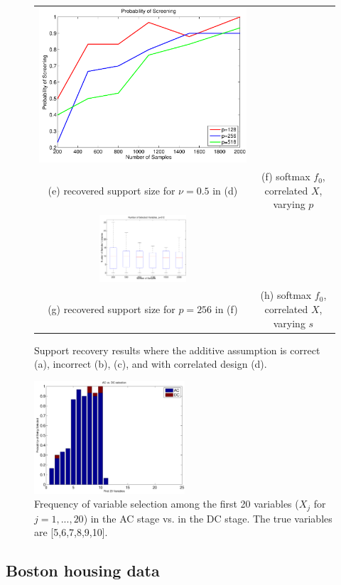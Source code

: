 \begin{figure}[!t]
\begin{center}
\begin{tabular}{cc}
\includegraphics[width=.42\textwidth]{figs/CurveS}\\
(e) recovered support size for $\nu=0.5$ in (d) & (f) softmax $f_0$, correlated $X$, varying $p$ \\
\includegraphics[width=0.42\textwidth]{figs/S_support_box} & \\
(g) recovered support size for $p=256$ in (f) & (h) softmax $f_0$, correlated $X$, varying $s$ 
\end{tabular}
\end{center}
\caption{Support recovery results where the additive assumption is
  correct (a), incorrect (b), (c), and with correlated design (d).}\label{Support}
\vskip10pt
\end{figure}

\begin{figure}
\includegraphics[width=0.5\textwidth]{figs/ACvDC}
\caption{Frequency of variable selection among the first 20 variables ($X_j$ for $j=1,...,20$) in the AC stage vs. in the DC stage. The true variables are [5,6,7,8,9,10].}
\label{fig:ac_v_dc}
\end{figure}


\subsection{Boston housing data}

